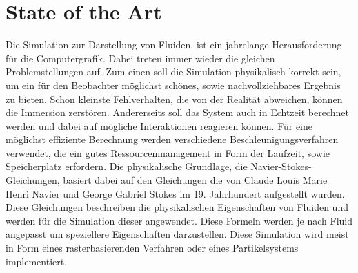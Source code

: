 \documentclass[intern,palatino]{cgBA}
\begin{document}
\section{State of the Art}\label{state}
Die Simulation zur Darstellung von Fluiden, ist ein jahrelange Herausforderung für die Computergrafik. Dabei treten immer wieder die gleichen Problemstellungen auf. Zum einen soll die Simulation physikalisch korrekt sein, um ein für den Beobachter möglichst schönes, sowie nachvollziehbares Ergebnis zu bieten. Schon kleinste Fehlverhalten, die von der Realität abweichen, können die Immersion zerstören. Andererseits soll das System auch in Echtzeit berechnet werden und dabei auf mögliche Interaktionen reagieren können. Für eine möglichst effiziente Berechnung werden verschiedene Beschleunigungsverfahren verwendet, die ein gutes Ressourcenmanagement in Form der Laufzeit, sowie Speicherplatz erfordern.
\newline \newline
Die physikalische Grundlage, die Navier-Stokes-Gleichungen, basiert dabei auf den Gleichungen die von Claude Louis Marie Henri Navier und George Gabriel Stokes im 19. Jahrhundert aufgestellt wurden. Diese Gleichungen beschreiben die physikalischen Eigenschaften von Fluiden und werden für die Simulation dieser angewendet. Diese Formeln werden je nach Fluid angepasst um speziellere Eigenschaften darzustellen\cite{temam1978navier}.
\newline
Diese Simulation wird meist in Form eines rasterbasierenden Verfahren oder eines Partikelsystems implementiert.
\end{document}
